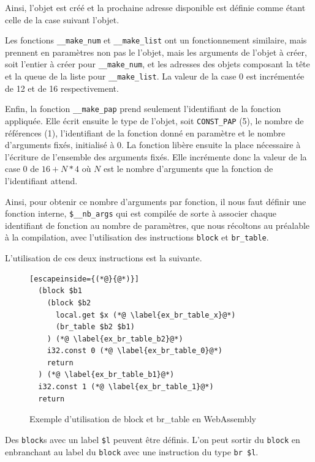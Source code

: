\documentclass{rapportECL}
\begin{document}
Ainsi, l'objet est créé et la prochaine adresse disponible est définie comme étant celle de la case suivant l'objet.

\bigskip

Les fonctions \verb|__make_num| et \verb|__make_list| ont un fonctionnement similaire, mais prennent en paramètres non pas le 
l'objet, mais les arguments de l'objet à créer, soit l'entier à créer pour \verb|__make_num|, et les adresses des objets composant la tête et la 
queue de la liste pour \verb|__make_list|. La valeur de la case 0 est incrémentée de 12 et de 16 respectivement.

\bigskip

Enfin, la fonction \verb|__make_pap| prend seulement l'identifiant de la fonction appliquée. Elle écrit ensuite le type de l'objet, 
soit \verb|CONST_PAP| (5), le nombre de références (1), l'identifiant de la fonction donné en paramètre et le nombre d'arguments 
fixés, initialisé à 0. La fonction libère ensuite la place nécessaire à l'écriture de l'ensemble des arguments fixés.
Elle incrémente donc la valeur de la case 0 de $16 + N * 4 $ où $N$ est le nombre d'arguments que la fonction de l'identifiant attend.

Ainsi, pour obtenir ce nombre d'arguments par fonction, il nous faut définir une fonction interne, \verb|$__nb_args| qui est 
compilée de sorte à associer chaque identifiant de fonction au nombre de paramètres, que nous récoltons au préalable à la 
compilation, avec l'utilisation des instructions \verb|block| et \verb|br_table|.

L'utilisation de ces deux instructions est la suivante.

\begin{figure}[H]
	\begin{lstlisting}[escapeinside={(*@}{@*)}]
  (block $b1
    (block $b2
      local.get $x (*@ \label{ex_br_table_x}@*)
      (br_table $b2 $b1)
    ) (*@ \label{ex_br_table_b2}@*)
    i32.const 0 (*@ \label{ex_br_table_0}@*)
    return
  ) (*@ \label{ex_br_table_b1}@*)
  i32.const 1 (*@ \label{ex_br_table_1}@*)
  return
	\end{lstlisting}
	\caption{Exemple d'utilisation de block et br\_table en WebAssembly}
	\label{listing:example_block_br_table}
\end{figure}

Des \verb|block|s avec un label \verb|$l| peuvent être définis. L'on peut sortir du \verb|block| en enbranchant au label du 
\verb|block| avec une instruction du type \verb|br $l|.
\end{document}
